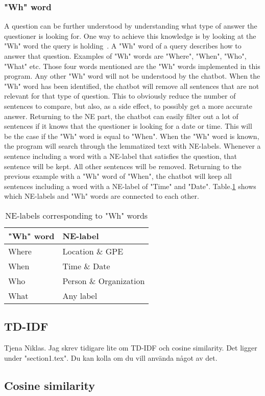 \subsubsection{"Wh" word}
A question can be further understood by understanding what type of answer the questioner is looking for. One way to achieve this knowledge is by looking at the "Wh" word the query is holding~\cite{RestrictedDomain}. A "Wh" word of a query describes how to answer that question. Examples of "Wh" words are "Where", "When", "Who", "What" etc. Those four words mentioned are the "Wh" words implemented in this program. Any other "Wh" word will not be understood by the chatbot. When the "Wh" word has been identified, the chatbot will remove all sentences that are not relevant for that type of question. This to obviously reduce the number of sentences to compare, but also, as a side effect, to possibly get a more accurate answer. Returning to the NE part, the chatbot can easily filter out a lot of sentences if it knows that the questioner is looking for a date or time. This will be the case if the "Wh" word is equal to "When". When the "Wh" word is known, the program will search through the lemmatized text with NE-labels. Whenever a sentence including a word with a NE-label that satisfies the question, that sentence will be kept. All other sentences will be removed. Returning to the previous example with a "Wh" word of "When", the chatbot will keep all sentences including a word with a NE-label of "Time" and "Date". Table.\ref{table:wh_words} shows which NE-labels and "Wh" words are connected to each other.

    \begin{table}[H]
    \begin{center}
    \caption{NE-labels corresponding to "Wh" words}
    \label{table:wh_words}
    \begin{tabular}{| l | l |}
    \hline
    "Wh" word  & NE-label           \\ \hline 
    Where & Location \& GPE         \\ \hline
    When  & Time \& Date            \\ \hline
    Who  & Person \& Organization   \\ \hline
    What  & Any label               \\ \hline 
    \end{tabular}
    \end{center}
    \end{table}



\subsection{TD-IDF}
Tjena Niklas. Jag skrev tidigare lite om TD-IDF och cosine similarity. Det ligger under "section1.tex". Du kan kolla om du vill använda något av det. 
\subsection{Cosine similarity}
